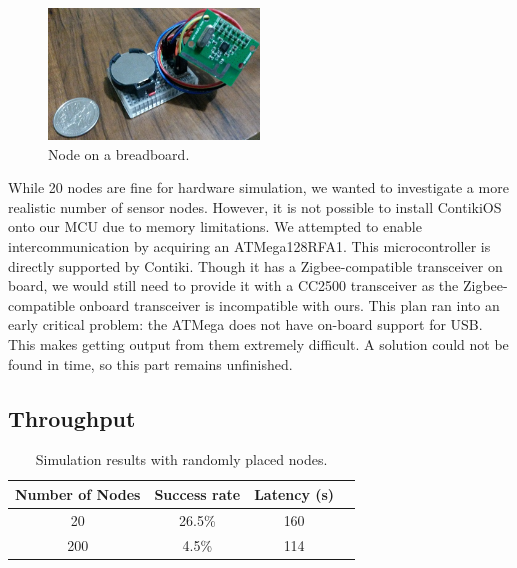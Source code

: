 \begin{figure}[h!]
  \centering
  \includegraphics[width=0.5\textwidth]{images/phone_picture.png}
  \caption{Node on a breadboard.
  \label{img:flowchart}
  }
\end{figure}

While 20 nodes are fine for hardware simulation, we wanted to investigate a more realistic number of sensor nodes. However, it is not possible to install ContikiOS onto our MCU due to memory limitations. We attempted to enable intercommunication by acquiring an ATMega128RFA1. This microcontroller is directly supported by Contiki. Though it has a Zigbee-compatible transceiver on board, we would still need to provide it with a CC2500 transceiver as the Zigbee-compatible onboard transceiver is incompatible with ours. This plan ran into an early critical problem: the ATMega does not have on-board support for USB. This makes getting output from them extremely difficult. A solution could not be found in time, so this part remains unfinished.

\subsection{Throughput}

%
%
\begin{table}%
  \begin{center}
  
  \begin{tabular}{| c | c | c | c |}

  \hline
  \textbf{Number of Nodes} & \textbf{Success rate} & \textbf{Latency (s)} \\
  \hline

  20               & 26.5\% & 160 \\
  200              & 4.5\% & 114 \\

  \hline
  
  \end{tabular}  
  \end{center}
  \caption{Simulation results with randomly placed nodes.
  \label{table:bill}
  }
\end{table}

